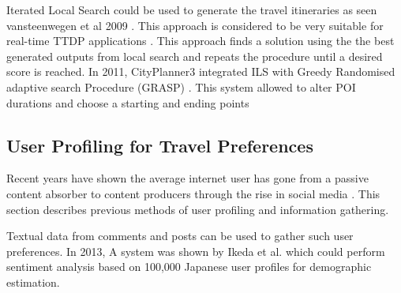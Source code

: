     Iterated Local Search could be used to generate the travel
    itineraries as seen vansteenwegen et al 2009
    \cite{Vansteenwegen2009}. This approach is considered to be very
    suitable for real-time TTDP applications \cite{Gavalas2015}. This
    approach finds a solution using the the best generated outputs
    from local search and repeats the procedure until a desired score
    is reached. In 2011, CityPlanner3 \cite{Vansteenwegen2011a}
    integrated ILS with Greedy Randomised adaptive search Procedure
    (GRASP) \cite{Feo1995}. This system allowed to alter POI durations
    and choose a starting and ending points

\subsection{User Profiling for Travel Preferences}

    Recent years have shown the average internet user has gone from a
    passive content absorber to content producers through the rise in
    social media \cite{Ikeda}. This section describes previous methods
    of user profiling and information gathering.

    Textual data from comments and posts can be used to gather such
    user preferences. In 2013, A system was shown by Ikeda et al.
    \cite{Ikeda} which could perform sentiment analysis based on
    100,000 Japanese user profiles for demographic estimation.
     


 
